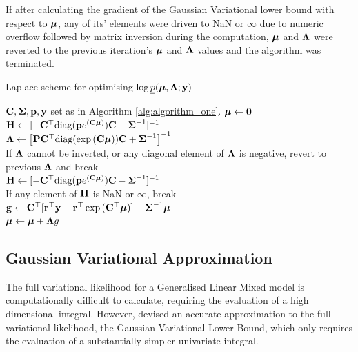 If after calculating the gradient of the Gaussian Variational lower bound with
respect to ${\boldsymbol \mu}$, any of its' elements were driven to NaN or $\infty$ due to
numeric overflow followed by matrix inversion during the computation, ${\boldsymbol \mu}$
and ${\boldsymbol \Lambda}$ were reverted to the previous iteration's ${\boldsymbol \mu}$ and ${\boldsymbol \Lambda}$
values and the algorithm was terminated.
		
\begin{algorithm}
	\caption{Laplace scheme for optimising $\log \underline{p}({\boldsymbol \mu}, {\boldsymbol \Lambda}; {\bf y})$}
	\label{alg:laplace_alg}
	\begin{algorithmic}
		\REQUIRE ${\bf C}, {\boldsymbol \Sigma}, {\bf p}, {\bf y}$ set as in Algorithm \ref{alg:algorithm_one}.
		\STATE ${\boldsymbol \mu} \leftarrow {\bf0}$ \\ [1ex]
		\STATE ${\bf H} \leftarrow [- {\bf C}^\top \text{diag}({\bf p} e^{({\bf C} {\boldsymbol \mu})}) {\bf C} - {\boldsymbol \Sigma}^{-1}]^{-1}$ \\ [1ex]
        \STATE ${\boldsymbol \Lambda} \leftarrow \left [{\bf P} {\bf C}^\top \text{diag}(\exp{({\bf C}{\boldsymbol\mu})}) {\bf C} + {\boldsymbol \Sigma}^{-1} \right ]^{-1}$ \\ [1ex] 
		If ${\boldsymbol \Lambda}$ cannot be inverted, or any diagonal element of ${\boldsymbol \Lambda}$ is negative, revert to previous
		${\boldsymbol \Lambda}$ and break \\ [1ex]
		\STATE ${\bf H}
		\leftarrow [- {\bf C}^\top \text{diag}({\bf p} e^{({\bf C} {\boldsymbol \mu})}) {\bf C} - {\boldsymbol \Sigma}^{-1}]^{-1}$ \\ [1ex]
		If any element of ${\bf H}$ is NaN or $\infty$, break \\ [1ex]
		\STATE ${\bf g} \leftarrow {\bf C}^\top[{\bf r}^\top{\bf y} - {\bf r}^\top\exp{({\bf C}^\top{\boldsymbol\mu})}] - {\boldsymbol \Sigma}^{-1}{\boldsymbol \mu}$ \\ [1ex]
		\STATE ${\boldsymbol \mu} \leftarrow {\boldsymbol\mu} + {\boldsymbol \Lambda} g$ \\ [1ex]
		\ENDWHILE
	\end{algorithmic}
\end{algorithm}
		
\subsection{Gaussian Variational Approximation}
		
The full variational likelihood for a Generalised Linear Mixed model is
computationally difficult to calculate, requiring the evaluation of a high
dimensional integral. However, \cite{Ormerod2012} devised an accurate
approximation to the full variational likelihood, the Gaussian Variational
Lower Bound, which only requires the evaluation of a substantially simpler
univariate integral.
	
